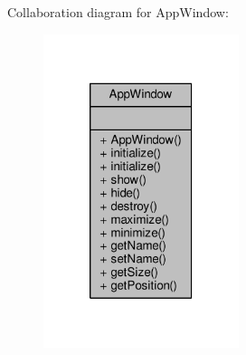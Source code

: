 Collaboration diagram for App\-Window\-:
\nopagebreak
\begin{figure}[H]
\begin{center}
\leavevmode
\includegraphics[width=162pt]{classAppWindow__coll__graph}
\end{center}
\end{figure}

